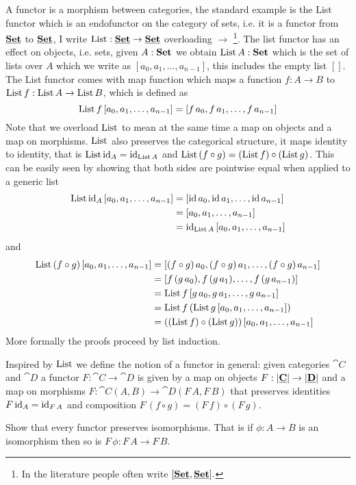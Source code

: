 A functor is a morphism between categories, the standard example is the List functor which is an endofunctor on the category of sets, i.e. it is a functor from $\underline{\mathbf{\mathbf{Set}}}$ to $\underline{\mathbf{\mathbf{Set}}}$, I write $\mathrm{List} : \underline{\mathbf{\mathbf{Set}}} \to \underline{\mathbf{\mathbf{Set}}}$ overloading $\to$%
\footnote{In the literature people often write $[\underline{\mathbf{\mathbf{Set}}},\underline{\mathbf{\mathbf{Set}}}].$}.
The list functor has an effect on objects, i.e. sets, given $A : \mathbf{Set}$ we obtain $\mathrm{List}\,A : \mathbf{Set}$ which is the set of lists over $A$ which we write as $[a_0,a_1,\dots,a_{n-1}]$, this includes the empty list $[]$.
The List functor comes with map function which maps a function $f : A \to B$ to $\mathrm{List}\,f : \mathrm{List}\,A \to \mathrm{List}\,B$, which is defined as 
\[ \mathrm{List}\,f\, [a_0,a_1,\dots,a_{n-1}] = [f\,a_0,f\,a_1,\dots,f\,a_{n-1}]\]
Note that we overload $\mathrm{List}$ to mean at the same time a map on objects and a map on morphisms. $\mathrm{List}$ also preserves the categorical structure, it maps identity to identity, that is $\mathrm{List}\,\mathrm{id}_A = \mathrm{id}_{\mathrm{List}\,A}$ and 
$\mathrm{List}\,(f\circ g) = (\mathrm{List}\,f) \circ (\mathrm{List}\,g)$. This can be easily seen by showing that both sides are pointwise equal when applied to a generic list
\begin{align*}
\mathrm{List}\,\mathrm{id}_A\, [a_0,a_1,\dots,a_{n-1}] & =  [\mathrm{id}\,a_0,\mathrm{id}\,a_1,\dots,\mathrm{id}\,a_{n-1}] \\
& =  [a_0,a_1,\dots,a_{n-1}] \\
& = \mathrm{id}_{\mathrm{List}\,A}\,  [a_0,a_1,\dots,a_{n-1}]
\end{align*}
and
\begin{align*}
\mathrm{List}\,(f \circ g)\, [a_0,a_1,\dots,a_{n-1}] & =  [(f \circ g)\,a_0,(f\circ g)\,a_1,\dots,(f\circ g)\,a_{n-1}] \\
& =  [f\,(g\,a_0),f\,(g\,a_1),\dots,f \,(g\, a_{n-1})] \\
& = \mathrm{List}\,f\, [g\,a_0,g\,a_1,\dots,g\, a_{n-1}]\\
& = \mathrm{List}\,f\,(\mathrm{List}\,g\, [a_0,a_1,\dots,a_{n-1}])\\
& = ((\mathrm{List}\,f) \circ (\mathrm{List}\,g))\, [a_0,a_1,\dots,a_{n-1}]
\end{align*}
More formally the proofs proceed by list induction.

Inspired by $\mathrm{List}$ we define the notion of a functor in general: given categories $\cat{C}$ and $\cat{D}$ a functor $F : \cat{C} \to \cat{D}$ is given by a map on objects $F : |\underline{\mathbf{C}}| \to |\underline{\mathbf{D}}|$ and a map on morphisms 
$F : \cat{C}(A,B) \to \cat{D}(F\,A,F\,B)$ that preserves identities $F\,\mathrm{id}_A = \mathrm{id}_{F\,A}$ and composition $F\,(f \circ g) = (F\,f) \circ (F\,g)$.

\begin{Exercise}
  Show that every functor preserves isomorphisms. That is if $\phi : A \to B$ is an isomorphism then so is $F\,\phi : F\,A \to F\,B$.
\end{Exercise}

